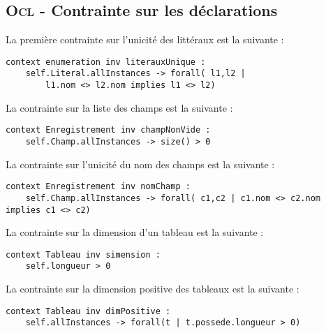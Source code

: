 
\subsection{\textsc{Ocl} - Contrainte sur les déclarations}
\label{sec:question15}

La première contrainte sur l'unicité des littéraux est la suivante :

\begin{lstlisting}[caption=unicité des litéraux,captionpos=b,label={lst:lit_unique},language=OCL]
context enumeration inv literauxUnique :
	self.Literal.allInstances -> forall( l1,l2 | 
		l1.nom <> l2.nom implies l1 <> l2)
\end{lstlisting}

La contrainte sur la liste des champs est la suivante :

\begin{lstlisting}[caption=champ non vide,captionpos=b,label={lst:champ},language=OCL]
context Enregistrement inv champNonVide :
	self.Champ.allInstances -> size() > 0
\end{lstlisting}

La contrainte sur l'unicité du nom des champs est la suivante :

\begin{lstlisting}[caption=Nom unique des champs,captionpos=b,label={lst:champ_unique},language=OCL]
context Enregistrement inv nomChamp :
	self.Champ.allInstances -> forall( c1,c2 | c1.nom <> c2.nom implies c1 <> c2)
\end{lstlisting}

La contrainte sur la dimension d'un tableau est la suivante :

\begin{lstlisting}[caption=dimension d'un tableau,captionpos=b,label={lst:dim_tableau},language=OCL]
context Tableau inv simension :
	self.longueur > 0
\end{lstlisting}

La contrainte sur la dimension positive des tableaux est la suivante :

\begin{lstlisting}[caption=Dimension positive,captionpos=b,label={lst:dim_positive},language=OCL]
context Tableau inv dimPositive :
	self.allInstances -> forall(t | t.possede.longueur > 0)
\end{lstlisting}